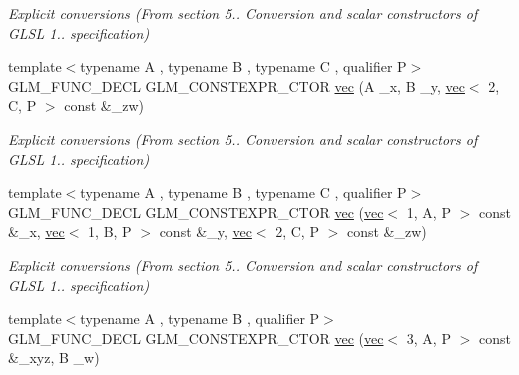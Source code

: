 \begin{DoxyCompactItemize}
\begin{DoxyCompactList}\small\item\em Explicit conversions (From section 5.. Conversion and scalar constructors of G\+L\+SL 1.. specification) \end{DoxyCompactList}\item 
\mbox{\label{structglm_1_1vec_3_014_00_01T_00_01Q_01_4_a5102bf3529e597f13aa16031b1fd71aa}} 
{\footnotesize template$<$typename A , typename B , typename C , qualifier P$>$ }\\G\+L\+M\+\_\+\+F\+U\+N\+C\+\_\+\+D\+E\+CL G\+L\+M\+\_\+\+C\+O\+N\+S\+T\+E\+X\+P\+R\+\_\+\+C\+T\+OR \hyperlink{structglm_1_1vec_3_014_00_01T_00_01Q_01_4_a5102bf3529e597f13aa16031b1fd71aa}{vec} (A \+\_\+x, B \+\_\+y, \hyperlink{structglm_1_1vec}{vec}$<$ 2, C, P $>$ const \&\+\_\+zw)
\begin{DoxyCompactList}\small\item\em Explicit conversions (From section 5.. Conversion and scalar constructors of G\+L\+SL 1.. specification) \end{DoxyCompactList}\item 
\mbox{\label{structglm_1_1vec_3_014_00_01T_00_01Q_01_4_adee69249b84755de6d21c4b5aba9af0c}} 
{\footnotesize template$<$typename A , typename B , typename C , qualifier P$>$ }\\G\+L\+M\+\_\+\+F\+U\+N\+C\+\_\+\+D\+E\+CL G\+L\+M\+\_\+\+C\+O\+N\+S\+T\+E\+X\+P\+R\+\_\+\+C\+T\+OR \hyperlink{structglm_1_1vec_3_014_00_01T_00_01Q_01_4_adee69249b84755de6d21c4b5aba9af0c}{vec} (\hyperlink{structglm_1_1vec}{vec}$<$ 1, A, P $>$ const \&\+\_\+x, \hyperlink{structglm_1_1vec}{vec}$<$ 1, B, P $>$ const \&\+\_\+y, \hyperlink{structglm_1_1vec}{vec}$<$ 2, C, P $>$ const \&\+\_\+zw)
\begin{DoxyCompactList}\small\item\em Explicit conversions (From section 5.. Conversion and scalar constructors of G\+L\+SL 1.. specification) \end{DoxyCompactList}\item 
\mbox{\label{structglm_1_1vec_3_014_00_01T_00_01Q_01_4_af4d56895a23186981b30f2ef72a780c9}} 
{\footnotesize template$<$typename A , typename B , qualifier P$>$ }\\G\+L\+M\+\_\+\+F\+U\+N\+C\+\_\+\+D\+E\+CL G\+L\+M\+\_\+\+C\+O\+N\+S\+T\+E\+X\+P\+R\+\_\+\+C\+T\+OR \hyperlink{structglm_1_1vec_3_014_00_01T_00_01Q_01_4_af4d56895a23186981b30f2ef72a780c9}{vec} (\hyperlink{structglm_1_1vec}{vec}$<$ 3, A, P $>$ const \&\+\_\+xyz, B \+\_\+w)

\end{DoxyCompactItemize}
